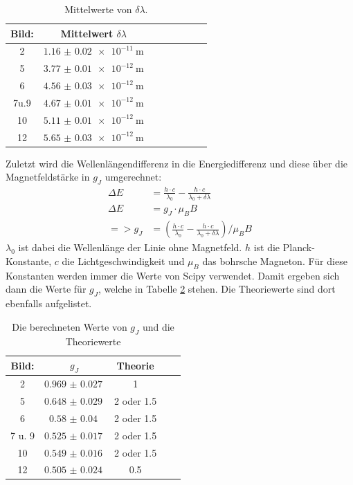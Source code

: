 \documentclass[
  bibliography=totoc,     %
  captions=tableheading,  %
  titlepage=firstiscover, %
]{scrartcl}
\begin{document}
\begin{landscape}
\begin{table}[H]
\end{table}
\begin{table}[H]
  \centering
  \caption{Mittelwerte von $\delta \lambda$.}
  \label{tab:wellenl2}
  \begin{tabular}{c c c c c c c c}
    \toprule
    Bild: & Mittelwert $\delta\lambda$ \\
    \midrule
    2 & $\SI{1.16(2)e-11}{\meter}$ \\
    5 & $\SI{3.77(1)e-12}{\meter}$ \\
    6 & $\SI{4.56(3)e-12}{\meter}$ \\
    7u.9 & $\SI{4.67(1)e-12}{\meter}$ \\
    10 & $\SI{5.11(1)e-12}{\meter}$ \\
    12 & $\SI{5.65(3)e-12}{\meter}$ \\
    \bottomrule
  \end{tabular}
\end{table}
\end{landscape}
\noindent
Zuletzt wird die Wellenlängendifferenz in die Energiedifferenz und
diese über die Magnetfeldstärke in $g_J$ umgerechnet:
\begin{align}
  \Delta E &= \frac{h \cdot c}{\lambda_0}-\frac{h \cdot c}{\lambda_0+\delta\lambda}\\
  \Delta E &= g_J \cdot \mu_B B\\
  => g_J &= \left(\frac{h \cdot c}{\lambda_0}-\frac{h \cdot c}{\lambda_0+\delta\lambda}\right) / \mu_B B
\end{align}
$\lambda_0$ ist dabei die Wellenlänge der Linie ohne Magnetfeld. $h$ ist die Planck-Konstante, $c$ die Lichtgeschwindigkeit
und $\mu_B$ das bohrsche Magneton. Für diese Konstanten werden immer die Werte von Scipy \cite{scipy} verwendet.
Damit ergeben sich dann die Werte für $g_J$, welche in Tabelle \ref{tab:gjergebnisse} stehen.
Die Theoriewerte sind dort ebenfalls aufgelistet.
\begin{table}[H]
  \centering
  \caption{Die berechneten Werte von $g_J$ und die Theoriewerte}
  \label{tab:gjergebnisse}
  \begin{tabular}{c c c c c}
    \toprule
    Bild: & $g_J$ & Theorie \\
    \midrule
    2 & $\SI{0.969(27)}{}$ & 1 \\
    5 & $\SI{0.648(29)}{}$ & 2 oder 1.5 \\
    6 & $\SI{0.58(4)}{}$ & 2 oder 1.5 \\
    7 u. 9 & $\SI{0.525(17)}{}$ & 2 oder 1.5 \\
    10 & $\SI{0.549(16)}{}$ & 2 oder 1.5 \\
    12 & $\SI{0.505(24)}{}$ & 0.5 \\
    \bottomrule
  \end{tabular}
\end{table}
\end{document}
